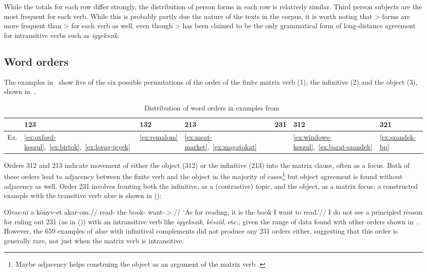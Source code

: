 While the totals for each row differ strongly, the distribution of person forms
in each row is relatively similar. Third person subjects are the most frequent
for each verb. While this is probably partly due the nature of the texts in the
corpus, it is worth noting that \Fpl>\Third{} forms are more frequent than
\Fsg{}>\Second{} for each verb as well, even though \Fsg>\Second{} has been
claimed to be the only grammatical form of long-distance agreement for
intransitive verbs such as \emph{igyekszik}.

\subsection{Word orders}\label{sub:word-orders}

The examples in~ show five of the six possible permutations of
the order of the finite matrix verb (1), the infinitive (2) and the object (3),
shown in~.

\begin{table}[htpb]
    \centering
    \begin{tabularx}{1\textwidth}{lXXXXXX}
    \toprule
        & 123 & 132 & 213 & 231 & 312 & 321 \\
    \midrule
    Ex. & \eqref{ex:oxford-keszul},~\eqref{ex:birtok},~\eqref{ex:lovag-igyek} &
                \eqref{ex:remalom} &
                    \eqref{ex:meat-market},~\eqref{ex:magatokat} &
                        &
                            \eqref{ex:windows-keszul},~\eqref{ex:barat-szandek} &
                                \eqref{ex:szandek-bp} \\
    \bottomrule
    \end{tabularx}
    \caption{Distribution of word orders in examples
    from~}\label{tb:data-orders}
\end{table}

Orders 312 and 213 indicate movement of either the object (312) or the
infinitive (213) into the matrix clause, often as a focus. Both of these orders
lead to adjacency between the finite verb and the object in the majority of
cases\footnote{Maybe adjacency helps construing the object as an argument of
the matrix verb \parencite{Peredy2009}.} but object agreement is found without
adjacency as well. Order 231 involves fronting both the infinitive, as a
(contrastive) topic, and the object, as a matrix focus; a constructed example
with the transitive verb \emph{akar} is shown in (\nextx):

\ex
    \begingl
        \gla 	Olvas-ni a könyv-et akar-om.//
        \glb 	read-\Inf{} the book-\Acc{} want-\Fsg.\Sbj>\Third.\Obj{}//
        \glft 	\enquote*{As for reading, it is the book I want to read.}//
    \endgl
\xe
I do not see a principled reason for ruling out 231 (as in (\lastx)) with an
intransitive verb like \emph{igyekszik}, \emph{készül}, etc., given the range
of data found with other orders shown in~.
%
However, the 659 examples of \emph{akar} with infinitival complements did not
produce any 231 orders either, suggesting that this order is generally rare,
not just when the matrix verb is intransitive.

